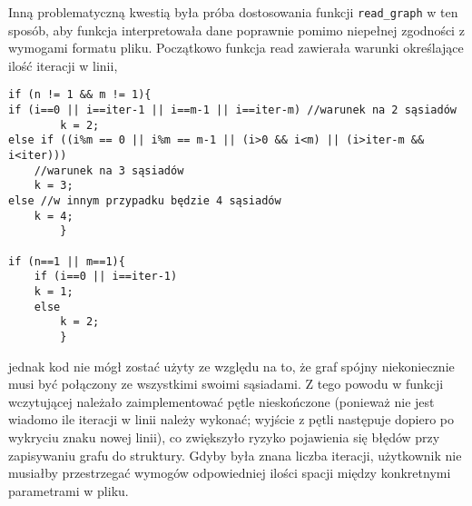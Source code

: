 \documentclass[]{article}
\begin{document}
Inną problematyczną kwestią była próba dostosowania funkcji \texttt{read\_graph} w ten sposób, aby funkcja interpretowała dane poprawnie pomimo niepełnej zgodności z wymogami formatu pliku. Początkowo funkcja read zawierała warunki określające ilość iteracji w linii,
\begin{verbatim}
if (n != 1 && m != 1){
if (i==0 || i==iter-1 || i==m-1 || i==iter-m) //warunek na 2 sąsiadów
        k = 2;
else if ((i%m == 0 || i%m == m-1 || (i>0 && i<m) || (i>iter-m && i<iter))) 
    //warunek na 3 sąsiadów
    k = 3;
else //w innym przypadku będzie 4 sąsiadów
    k = 4;
		}

if (n==1 || m==1){
	if (i==0 || i==iter-1)
    k = 1;
	else
		k = 2;
		}
		\end{verbatim}
		jednak kod nie mógł zostać użyty ze względu na to, że graf spójny niekoniecznie musi być połączony ze wszystkimi swoimi sąsiadami. Z tego powodu w funkcji wczytującej należało zaimplementować pętle nieskończone (ponieważ nie jest wiadomo ile iteracji w linii należy wykonać; wyjście z pętli następuje dopiero po wykryciu znaku nowej linii), co zwiększyło ryzyko pojawienia się błędów przy zapisywaniu grafu do struktury. Gdyby była znana liczba iteracji, użytkownik nie musiałby przestrzegać wymogów odpowiedniej ilości spacji między konkretnymi parametrami w pliku.
\end{document}
